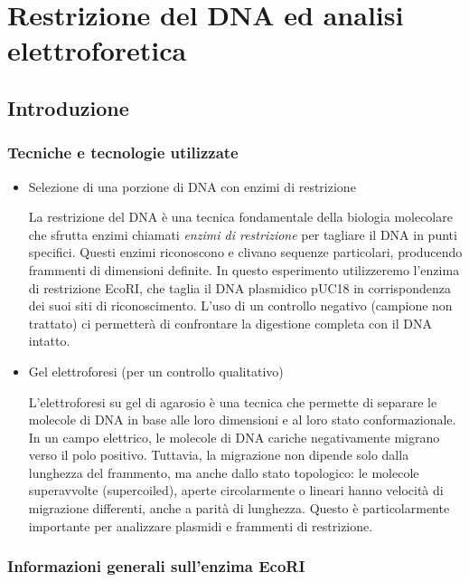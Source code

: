 \section {Restrizione del DNA ed analisi elettroforetica}

\subsection{Introduzione}

\subsubsection{Tecniche e tecnologie utilizzate}
\begin{itemize}
  \item Selezione di una porzione di DNA con enzimi di restrizione
  
  {\footnotesize La restrizione del DNA è una tecnica fondamentale della biologia molecolare che sfrutta enzimi chiamati \textit{enzimi di restrizione} per tagliare il DNA in punti specifici. Questi enzimi riconoscono e clivano sequenze particolari, producendo frammenti di dimensioni definite. In questo esperimento utilizzeremo l’enzima di restrizione EcoRI, che taglia il DNA plasmidico pUC18 in corrispondenza dei suoi siti di riconoscimento. L’uso di un controllo negativo (campione non trattato) ci permetterà di confrontare la digestione completa con il DNA intatto.}
  
  \item Gel elettroforesi (per un controllo qualitativo)
  
  {\footnotesize L’elettroforesi su gel di agarosio è una tecnica che permette di separare le molecole di DNA in base alle loro dimensioni e al loro stato conformazionale. In un campo elettrico, le molecole di DNA cariche negativamente migrano verso il polo positivo. Tuttavia, la migrazione non dipende solo dalla lunghezza del frammento, ma anche dallo stato topologico: le molecole superavvolte (supercoiled), aperte circolarmente o lineari hanno velocità di migrazione differenti, anche a parità di lunghezza. Questo è particolarmente importante per analizzare plasmidi e frammenti di restrizione.}
\end{itemize}

\subsubsection{Informazioni generali sull'enzima EcoRI}

